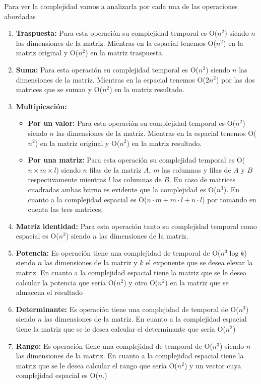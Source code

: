 Para ver la complejidad vamos a analizarla por cada una de las operaciones abordadas

\begin{enumerate}
	\item \textbf{Traspuesta:} Para esta operación  su complejidad temporal es O($n^2$) siendo $n$ las dimensiones de la matriz. Mientras en la espacial tenemos O($n^2$) en la matriz original y O($n^2$) en la matriz traspuesta.
	\item \textbf{Suma:} Para esta operación  su complejidad temporal es O($n^2$) siendo $n$ las dimensiones de la matriz. Mientras en la espacial tenemos O($2n^2$)  por las dos matrices que se suman y O($n^2$) en la matriz resultado.
	\item \textbf{Multipicación:}
	\begin{itemize}
		\item \textbf{Por un valor:} Para esta operación su complejidad temporal es O($n^2$) siendo $n$ las dimensiones de la matriz. Mientras en la espacial tenemos O($n^2$) en la matriz original y O($n^2$) en la matriz resultado.
		\item \textbf{Por una matriz:}  Para esta operación su complejidad temporal es O($n\times m \times l $) siendo $n$ filas de la matriz $A$, $m$ las columnas y filas de $A$ y $B$ respectivamente mientras $l$ las columnas de $B$. En caso de matrices cuadradas ambas burno es evidente que la complejidad es O($n^3$). En cuanto a la complejidad espacial es O($n\cdot m + m\cdot l+ n\cdot l$) por tomando en cuenta las tres matrices.
	\end{itemize}
	\item \textbf{Matriz identidad:} Para esta operación tanto su complejidad temporal como espacial es O($n^2$) siendo $n$ las dimensiones de la matriz.
	\item \textbf{Potencia:} Es operación tiene una complejidad de temporal de O($n^3\log k$) siendo $n$ las dimensiones de la matriz y $k$ el exponente que se desea elevar la matriz. En cuanto a la complejidad espacial tiene la matriz que se le desea calcular la potencia que sería O($n^2$) y otro O($n^2$) en la matriz que se almacena el resultado 
	\item \textbf{Determinante:} Es operación tiene una complejidad de temporal de O($n^3$) siendo $n$ las dimensiones de la matriz. En cuanto a la complejidad espacial tiene la matriz que se le desea calcular el determinante que sería O($n^2$)
	\item \textbf{Rango:} Es operación tiene una complejidad de temporal de O($n^3$) siendo $n$ las dimensiones de la matriz. En cuanto a la complejidad espacial tiene la matriz que se le desea calcular el rango que sería O($n^2$) y un vector cuya complejidad espacial es O($n$.)
\end{enumerate}